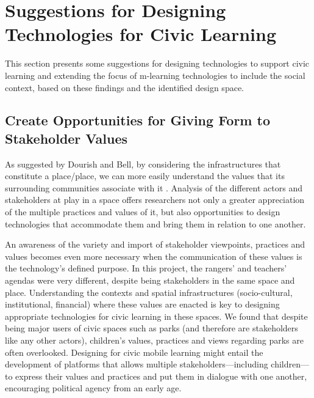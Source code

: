 \section{Suggestions for Designing Technologies for Civic Learning}

This section presents some suggestions for designing technologies to support civic learning and extending the focus of m-learning technologies to include the social context, based on these findings and the identified design space.

\subsection{Create Opportunities for Giving Form to Stakeholder Values}

As suggested by Dourish and Bell, by considering the infrastructures that constitute a place/place, we can more easily understand the values that its surrounding communities associate with it \citep{Dourish2007}. Analysis of the different actors and stakeholders at play in a space offers researchers not only a greater appreciation of the multiple practices and values of it, but also opportunities to design technologies that accommodate them and bring them in relation to one another.

An awareness of the variety and import of stakeholder viewpoints, practices and values becomes even more necessary when the communication of these values is the technology’s defined purpose. In this project, the rangers' and teachers' agendas were very different, despite being stakeholders in the same space and place. Understanding the contexts and spatial infrastructures (socio-cultural, institutional, financial) where these values are enacted is key to designing appropriate technologies for civic learning in these spaces. We found that despite being major users of civic spaces such as parks (and therefore are stakeholders like any other actors), children’s values, practices and views regarding parks are often overlooked. Designing for civic mobile learning might entail the development of platforms that allows multiple stakeholders---including children---to express their values and practices and put them in dialogue with one another, encouraging political agency from an early age.

